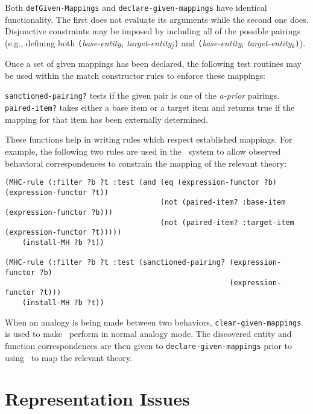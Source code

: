 Both {\tt defGiven-Mappings} and {\tt declare-given-mappings} have identical
functionality. The first does not evaluate its arguments while the second
one does. Disjunctive constraints may be imposed by including all of the
possible pairings (e.g., defining both {\tt (}{\it base-entity$_{i}$
target-entity$_{j}$}{\tt )} and {\tt (}{\it base-entity$_{i}$
target-entity$_{k}$}{\tt )}).

Once a set of given mappings has been declared, the following test routines
may be used within the match constructor rules to enforce these mappings:


\noindent
{\tt sanctioned-pairing?} tests if the given pair is one of the {\it a-prior}
pairings. {\tt paired-item?} takes either a base item or a target item and returns
true if the mapping for that item has been externally determined.

These functions help in writing rules which respect established mappings.
For example, the following two rules are used in the \Phineas\ system to
allow observed behavioral correspondences to constrain the mapping of the
relevant theory:

\begin{small}
\begin{verbatim}
(MHC-rule (:filter ?b ?t :test (and (eq (expression-functor ?b) (expression-functor ?t))
                                    (not (paired-item? :base-item (expression-functor ?b)))
                                    (not (paired-item? :target-item (expression-functor ?t)))))
    (install-MH ?b ?t))

(MHC-rule (:filter ?b ?t :test (sanctioned-pairing? (expression-functor ?b)
                                                    (expression-functor ?t)))
    (install-MH ?b ?t))
\end{verbatim}
\end{small}

When an analogy is being made between two behaviors, {\tt clear-given-mappings}
is used to make \SME\ perform in normal analogy mode. The discovered entity and
function correspondences are then given to {\tt declare-given-mappings} prior to
using \SME\ to map the relevant theory.


\section{Representation Issues}

